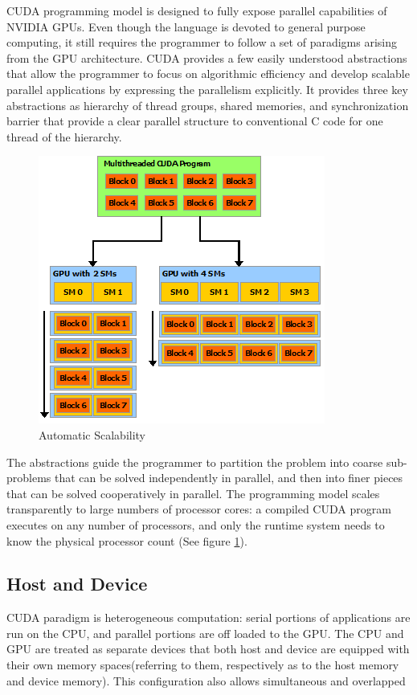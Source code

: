 CUDA programming model is designed to fully expose parallel capabilities of NVIDIA GPUs.
Even though the language is devoted to general purpose computing, it still requires the
programmer to follow a set of paradigms arising from the GPU architecture.
CUDA provides a few easily understood abstractions that allow the programmer to
focus on algorithmic efficiency and develop scalable parallel applications by expressing the
parallelism explicitly. It provides three key abstractions as hierarchy of
thread groups, shared memories, and synchronization barrier that provide a
clear parallel structure to conventional C code for one thread of the hierarchy.
\begin{figure}
\includegraphics[scale=0.9]{./images/automatic-scalability}
\caption{Automatic Scalability}\label{automatic-scalability}
\end{figure}
\FloatBarrier
The abstractions guide the programmer to partition the
problem into coarse sub-problems that can be solved independently in parallel, and then into
finer pieces that can be solved cooperatively in parallel. The programming model scales
transparently to large numbers of processor cores: a compiled CUDA program executes on any
number of processors, and only the runtime system needs to know the physical
processor count (See figure \ref{automatic-scalability}).

\subsection{Host and Device}
CUDA paradigm is heterogeneous computation:
serial portions of applications are run on the CPU, and parallel portions are
off loaded to the GPU.
The CPU and GPU are treated as separate devices that both host and device
are equipped with their own memory spaces(referring to them, respectively as to
the host memory and device memory). This configuration also allows simultaneous and overlapped

